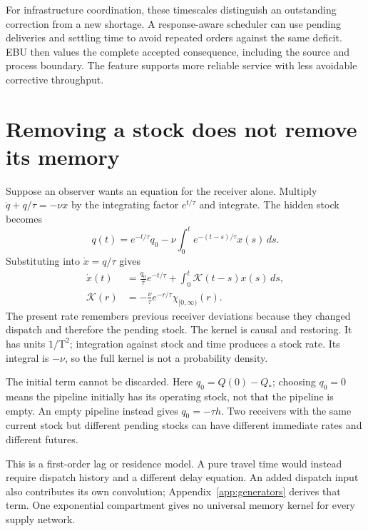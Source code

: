 For infrastructure coordination, these timescales distinguish an outstanding correction from a new shortage. A response-aware scheduler can use pending deliveries and settling time to avoid repeated orders against the same deficit. EBU then values the complete accepted consequence, including the source and process boundary. The feature supports more reliable service with less avoidable corrective throughput.

\section{Removing a stock does not remove its memory}
Suppose an observer wants an equation for the receiver alone. Multiply $\dot q+q/\tau=-\nu x$ by the integrating factor $e^{t/\tau}$ and integrate. The hidden stock becomes
\begin{equation}\label{eq:tank-hidden}
 q(t)=e^{-t/\tau}q_0-\nu\int_0^t e^{-(t-s)/\tau}x(s)\,ds.
\end{equation}
Substituting into $\dot x=q/\tau$ gives
\begin{align}\label{eq:tank-memory}
 \dot x(t)&=\frac{q_0}{\tau}e^{-t/\tau}
      +\int_0^t\mathcal K(t-s)x(s)\,ds,\\
 \mathcal K(r)&=-\frac\nu\tau e^{-r/\tau}\chi_{[0,\infty)}(r).
 \nonumber
\end{align}
The present rate remembers previous receiver deviations because they changed dispatch and therefore the pending stock. The kernel is causal and restoring. It has units $1/\mathrm T^2$; integration against stock and time produces a stock rate. Its integral is $-\nu$, so the full kernel is not a probability density.

The initial term cannot be discarded. Here $q_0=Q(0)-Q_*$; choosing $q_0=0$ means the pipeline initially has its operating stock, not that the pipeline is empty. An empty pipeline instead gives $q_0=-\tau h$. Two receivers with the same current stock but different pending stocks can have different immediate rates and different futures.


This is a first-order lag or residence model. A pure travel time would instead require dispatch history and a different delay equation. An added dispatch input also contributes its own convolution; Appendix~\ref{app:generators} derives that term. One exponential compartment gives no universal memory kernel for every supply network.

